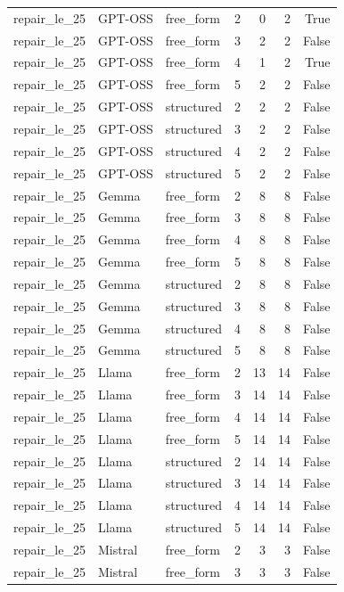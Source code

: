 \begin{longtable}{lllrrrr}
repair\_le\_25 & GPT-OSS & free\_form & 2 & 0 & 2 & True \\
repair\_le\_25 & GPT-OSS & free\_form & 3 & 2 & 2 & False \\
repair\_le\_25 & GPT-OSS & free\_form & 4 & 1 & 2 & True \\
repair\_le\_25 & GPT-OSS & free\_form & 5 & 2 & 2 & False \\
repair\_le\_25 & GPT-OSS & structured & 2 & 2 & 2 & False \\
repair\_le\_25 & GPT-OSS & structured & 3 & 2 & 2 & False \\
repair\_le\_25 & GPT-OSS & structured & 4 & 2 & 2 & False \\
repair\_le\_25 & GPT-OSS & structured & 5 & 2 & 2 & False \\
repair\_le\_25 & Gemma & free\_form & 2 & 8 & 8 & False \\
repair\_le\_25 & Gemma & free\_form & 3 & 8 & 8 & False \\
repair\_le\_25 & Gemma & free\_form & 4 & 8 & 8 & False \\
repair\_le\_25 & Gemma & free\_form & 5 & 8 & 8 & False \\
repair\_le\_25 & Gemma & structured & 2 & 8 & 8 & False \\
repair\_le\_25 & Gemma & structured & 3 & 8 & 8 & False \\
repair\_le\_25 & Gemma & structured & 4 & 8 & 8 & False \\
repair\_le\_25 & Gemma & structured & 5 & 8 & 8 & False \\
repair\_le\_25 & Llama & free\_form & 2 & 13 & 14 & False \\
repair\_le\_25 & Llama & free\_form & 3 & 14 & 14 & False \\
repair\_le\_25 & Llama & free\_form & 4 & 14 & 14 & False \\
repair\_le\_25 & Llama & free\_form & 5 & 14 & 14 & False \\
repair\_le\_25 & Llama & structured & 2 & 14 & 14 & False \\
repair\_le\_25 & Llama & structured & 3 & 14 & 14 & False \\
repair\_le\_25 & Llama & structured & 4 & 14 & 14 & False \\
repair\_le\_25 & Llama & structured & 5 & 14 & 14 & False \\
repair\_le\_25 & Mistral & free\_form & 2 & 3 & 3 & False \\
repair\_le\_25 & Mistral & free\_form & 3 & 3 & 3 & False \\

\end{longtable}
